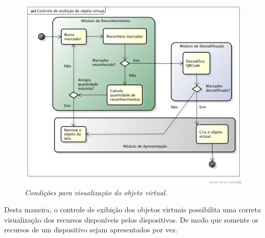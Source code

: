 	\begin{figure}[htb]
		\centering \includegraphics[scale=0.55]{figuras/cap4/condicoes_objeto.png}
		\caption{\textit{Condições para visualização do objeto virtual.}}
		\label{fig:condicoes_objeto} 
	\end{figure}

	Desta maneira, o controle de exibição dos objetos virtuais possibilita uma correta visualização
	dos recursos disponíveis pelos dispositivos. De modo que somente os recursos de um dispositivo
	sejam apresentados por vez.
	
